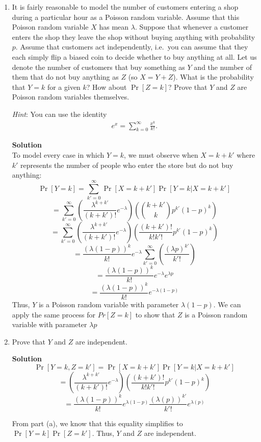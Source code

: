 \documentclass[11pt]{article}
\newenvironment{Parts}{\begin{enumerate}[label=(\alph*)]}{\end{enumerate}}
\newcommand*{\Part}{\item}
\newenvironment{Answer}{\vspace{10pt}\begin{mdframed}\textbf{Solution}\\}{\end{mdframed}\vfill\pagebreak[3]}
\newenvironment{Answer}{\vspace{10pt}}{\vfill\pagebreak[3]}
\begin{document}
\begin{Parts}
	\Part  It is fairly reasonable to model the number of customers entering a shop during a particular hour as a Poisson random variable. Assume that this Poisson random variable $X$ has mean $\lambda$. Suppose that whenever a customer enters the shop they leave the shop without buying anything with probability $p$. Assume that customers act independently, i.e.~you can assume that they each simply flip a biased coin to decide whether to buy anything at all. Let us denote the number of customers that buy something as $Y$ and the number of them that do not buy anything as $Z$ (so $X = Y+Z$). 
	What is the probability that $Y=k$ for a given $k$? How about $\Pr[Z=k]$? Prove that $Y$ and $Z$ are Poisson random variables themselves.

	\textit{Hint}: You can use the identity
	\begin{align*}
	    e^x=\sum_{k=0}^{\infty}\frac{x^k}{k!}.
	\end{align*}
	\begin{Answer}
        To model every case in which $Y=k$, we must observe when $X=k+k'$ where $k'$ represents the number of people who enter the store but do not buy anything:
        $$\Pr[Y=k]=\sum_{k'=0}^{\infty} \Pr[X=k+k']\Pr[Y=k|X=k+k']$$
        $$=\sum_{k'=0}^{\infty}(\frac{\lambda^{k+k'}}{(k+k')!}e^{-\lambda})(\binom{k+k'}{k}p^{k'}(1-p)^k)$$
        $$=\sum_{k'=0}^{\infty}(\frac{\lambda^{k+k'}}{(k+k')!}e^{-\lambda})(\frac{(k+k')!}{k!k'!}p^{k'}(1-p)^k)$$
	    $$=\frac{(\lambda(1-p))^k}{k!}e^{-\lambda}\sum_{k'=0}^{\infty}(\frac{(\lambda p)^{k'}}{k'!})$$
	    $$=\frac{(\lambda(1-p))^k}{k!}e^{-\lambda}e^{\lambda p}$$
	    $$=\frac{(\lambda(1-p))^k}{k!}e^{-\lambda(1-p)}$$
	    Thus, $Y$ is a Poisson random variable with parameter $\lambda (1-p)$. We can apply the same process for $Pr[Z=k]$ to show that $Z$ is a Poisson random variable with parameter $\lambda p$
	\end{Answer}

	\Part Prove that $Y$ and $Z$ are independent.
	\begin{Answer}
        $$\Pr[Y=k, Z=k']=\Pr[X=k+k']\Pr[Y=k|X=k+k']$$
        $$=(\frac{\lambda^{k+k'}}{(k+k')!}e^{-\lambda})(\frac{(k+k')!}{k!k'!}p^{k'}(1-p)^k)$$
        $$=\frac{(\lambda(1-p))^k}{k!}e^{\lambda(1-p)}\frac{(\lambda(p))^{k'}}{k'!}e^{\lambda(p)}$$
        
        From part (a), we know that this equality simplifies to $\Pr[Y=k]\Pr[Z=k']$. Thus, $Y$ and $Z$ are independent. 
	\end{Answer}


\end{Parts}
\end{document}
